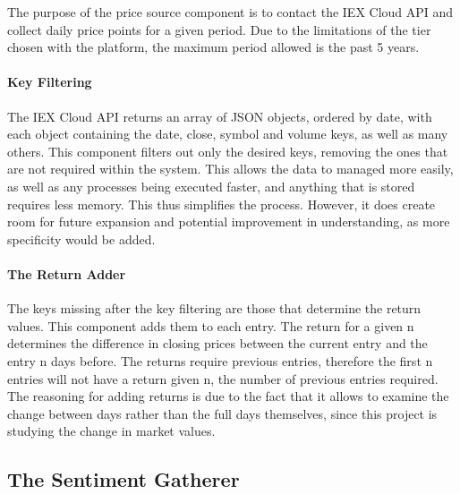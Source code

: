 The purpose of the price source component is to contact the IEX Cloud API and collect daily price points for a given period. Due to the limitations of the tier chosen with the platform, the maximum period allowed is the past 5 years.

\paragraph{Key Filtering}

The IEX Cloud API returns an array of JSON objects, ordered by date, with each object containing the date, close, symbol and volume keys, as well as many others. This component filters out only the desired keys, removing the ones that are not required within the system. This allows the data to managed more easily, as well as any processes being executed faster, and anything that is stored requires less memory. This thus simplifies the process. However, it does create room for future expansion and potential improvement in understanding, as more specificity would be added.

\paragraph{The Return Adder}

The keys missing after the key filtering are those that determine the return values. This component adds them to each entry. The return for a given n determines the difference in closing prices between the current entry and the entry n days before. The returns require previous entries, therefore the first n entries will not have a return given n, the number of previous entries required. The reasoning for adding returns is due to the fact that it allows to examine the change between days rather than the full days themselves, since this project is studying the change in market values.

\subsection{The Sentiment Gatherer}

